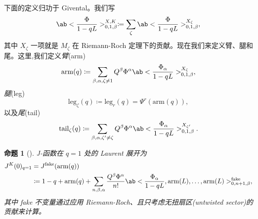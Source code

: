 \documentclass{amsart}
\newtheorem{prop}[thm]{命题}
\theoremstyle{definition}
\theoremstyle{remark}
\theoremstyle{plain}
\theoremstyle{definition}
\theoremstyle{remark}
\newcommand{\mr}[1]{\mathrm{#1}}
\newcommand{\1}{\mathbf{1}}
\newcommand{\2}{\mathbf{2}}
\newcommand{\3}{\mathbf{3}}
\begin{document}
%
%

下面的定义归功于 Givental。我们写
\[ \ab<\frac{\Phi}{1-qL}>_{0,1,\beta}^{X,K} \coloneqq \sum_{\zeta} \ab<\frac{\Phi}{1-qL}>_{0,1,\beta}^{X_{\zeta}}, \]
其中 \(X_{\zeta}\) 一项就是 \(M_{\zeta}\) 在 Riemann-Roch 定理下的贡献。现在我们来定义臂、腿和尾。这里,我们定义\textit{臂}(arm)
\[ \mr{arm}(q) \coloneqq \sum_{\beta, \alpha, \zeta \neq 1} Q^{\beta} \Phi^{\alpha}\ab<\frac{\Phi_{\alpha}}{1-qL}>_{0,1,\beta}^{X_{\zeta}}, \]
\textit{腿}(leg)
\[ \mr{leg}_{\zeta}(q) \coloneqq \mr{leg}_r(q) = \Psi^r (\mr{arm}(q)), \]
以及\textit{尾}(tail)
\[ \mr{tail}_{\zeta}(q) \coloneqq \sum_{\beta, \alpha, \zeta' \neq \zeta} Q^{\beta} \Phi^{\alpha} \ab<\frac{\Phi_{\alpha}}{1-qL}>_{0,1,\beta}^{X_{\zeta'}}. \]

\begin{prop}[{\cite{GiventalTonita2014}}]
    J-函数在 \(q = 1\) 处的 Laurent 展开为
    \begin{align*}
        J^K(0)_{q=1} &= J^{\mr{fake}}(\mr{arm}(q)) \\
        &\coloneqq 1-q + \mr{arm}(q) + \sum_{n,\beta,\alpha} \frac{Q^{\beta}\Phi^{\alpha}}{n!} \ab<\frac{\Phi_{\alpha}}{1-qL}, \mr{arm}(L), \ldots, \mr{arm}(L)>_{0,n+1,\beta}^{\mr{fake}},
    \end{align*}
    其中 fake 不变量通过应用 Riemann-Roch、且只考虑无扭扇区(untwisted sector)的贡献来计算。
\end{prop}
\end{document}
